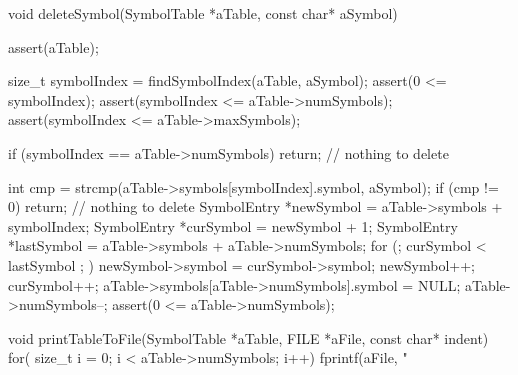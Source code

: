 void deleteSymbol(SymbolTable *aTable, const char* aSymbol) {
  assert(aTable);
  
  size_t symbolIndex = findSymbolIndex(aTable, aSymbol);
  assert(0 <= symbolIndex);
  assert(symbolIndex <= aTable->numSymbols);
  assert(symbolIndex <= aTable->maxSymbols);

  if (symbolIndex == aTable->numSymbols) return; // nothing to delete
  
  int cmp = strcmp(aTable->symbols[symbolIndex].symbol, aSymbol);
  if (cmp != 0) return; // nothing to delete
  SymbolEntry *newSymbol = aTable->symbols + symbolIndex;
  SymbolEntry *curSymbol = newSymbol + 1;
  SymbolEntry *lastSymbol = aTable->symbols + aTable->numSymbols;
  for (; curSymbol < lastSymbol ; ) {
    newSymbol->symbol = curSymbol->symbol;
    newSymbol++;
    curSymbol++;
  }
  aTable->symbols[aTable->numSymbols].symbol = NULL;
  aTable->numSymbols--;
  assert(0 <= aTable->numSymbols);
}

void printTableToFile(SymbolTable *aTable, FILE *aFile, const char* indent) {
  for( size_t i = 0; i < aTable->numSymbols; i++) {
    fprintf(aFile, "%
  }
}
\stopCCode

